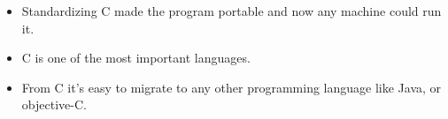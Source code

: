 \begin{itemize}
    \item Standardizing C made the program portable and now any machine could run it.
    \item C is one of the most important languages.
    \item From C it's easy to migrate to any other programming language like Java, or objective-C.
\end{itemize}
